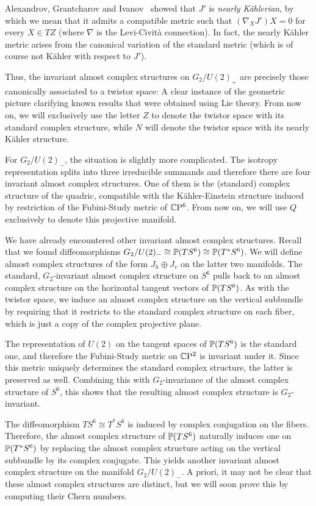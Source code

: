Alexandrov, Grantcharov and Ivanov~\cite{AGI1998} showed that $J'$ is \emph{nearly K\"ahlerian}, by which we mean that it admits a compatible metric such that $(\nabla_X J')X=0$ for every $X\in TZ$ (where $\nabla$ is the Levi-Civit\`a connection). In fact, the nearly K\"ahler metric arises from the canonical variation of the standard metric (which is of course not K\"ahler with respect to $J'$).

Thus, the invariant almost complex structures on $G_2/U(2)_+$ are precisely those canonically associated to a twistor space: A clear instance of the geometric picture clarifying known results that were obtained using Lie theory. From now on, we will exclusively use the letter $Z$ to denote the twistor space with its standard complex structure, while $N$ will denote the twistor space with its nearly K\"ahler structure.

For $G_2/U(2)_-$, the situation is slightly more complicated. The isotropy representation splits into three irreducible summands and therefore there are four invariant almost complex structures. One of them is the (standard) complex structure of the quadric, compatible with the K\"ahler-Einstein structure induced by restriction of the Fubini-Study metric of $\CP^6$. From now on, we will use $Q$ exclusively to denote this projective manifold. 

We have already encountered other invariant almost complex structures. Recall that we found diffeomorphisms $G_2/U(2)_-\cong \P(TS^6)\cong \P(T^*S^6)$. We will define almost complex structures of the form $J_h\oplus J_v$ on the latter two manifolds. The standard, $G_2$-invariant almost complex structure on $S^6$ pulls back to an almost complex structure on the horizontal tangent vectors of $\P(TS^6)$. As with the twistor space, we induce an almost complex structure on the vertical subbundle by requiring that it restricts to the standard complex structure on each fiber, which is just a copy of the complex projective plane. 

The representation of $U(2)$ on the tangent spaces of $\P(TS^6)$ is the standard one, and therefore the Fubini-Study metric on $\CP^2$ is invariant under it. Since this metric uniquely determines the standard complex structure, the latter is preserved as well. Combining this with $G_2$-invariance of the almost complex structure of $S^6$, this shows that the resulting almost complex structure is $G_2$-invariant.

The diffeomorphism $TS^6\cong T^*S^6$ is induced by complex conjugation on the fibers. Therefore, the almost complex structure of $\P(TS^6)$ naturally induces one on $\P(T^*S^6)$ by replacing the almost complex structure acting on the vertical subbundle by its complex conjugate. This yields another invariant almost complex structure on the manifold $G_2/U(2)_-$. A priori, it may not be clear that these almost complex structures are distinct, but we will soon prove this by computing their Chern numbers.

